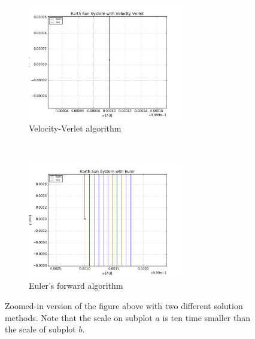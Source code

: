 \documentclass[a4paper, 10pt]{article}
\begin{document}
\begin{figure}[!ht]
    \centering
    \begin{subfigure}[H!]{0.5\textwidth}
        \centering
        \includegraphics[height=2.0in]{orbitESVV.png}
        \caption{Velocity-Verlet algorithm}
    \end{subfigure}%
    ~ 
    \begin{subfigure}[H!]{0.5\textwidth}
        \centering
        \includegraphics[height=2.0in]{orbitESEuler.png}
        \caption{Euler's forward algorithm}
    \end{subfigure}
    \caption{Zoomed-in version of the figure above with two different solution methods. Note that the scale on subplot $a$ is ten time smaller than the scale of subplot $b$.}
\end{figure}
\end{document}
